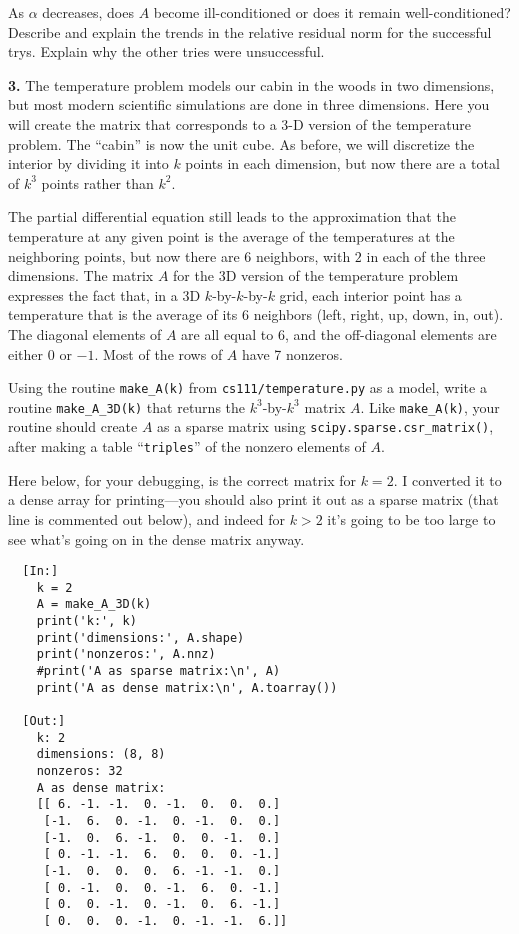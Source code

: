 \documentclass[11pt]{article}
\begin{document}
As $\alpha$ decreases, does $A$ become ill-conditioned or does it remain well-conditioned?
Describe and explain the trends in the relative residual norm 
for the successful trys.
Explain why the other tries were unsuccessful.

\par\bigskip
{\bf 3.}
The temperature problem models our cabin in the woods in two dimensions,
but most modern scientific simulations are done in three dimensions.
Here you will create the matrix that corresponds to a 3-D version of 
the temperature problem. The ``cabin'' is now the unit cube. As before,
we will discretize the interior by dividing it into $k$ points in each
dimension, but now there are a total of $k^3$ points rather than $k^2$.

The partial differential equation still leads to the approximation
that the temperature at any given point is the average of the temperatures
at the neighboring points, but now there are 6 neighbors, 
with $2$ in each of the three dimensions.
The matrix $A$ for the 3D version of the temperature problem
expresses the fact that, in a 3D $k$-by-$k$-by-$k$ grid, 
each interior point has a temperature that is the average of its 6 neighbors 
(left, right, up, down, in, out).
The diagonal elements of $A$ are all equal to $6$, 
and the off-diagonal elements are either $0$ or $-1$.
Most of the rows of $A$ have 7 nonzeros.

Using the routine {\tt make\_A(k)} from {\tt cs111/temperature.py} as a model, 
write a routine {\tt make\_A\_3D(k)} that returns the $k^3$-by-$k^3$ matrix $A$.
Like {\tt make\_A(k)}, your routine should create $A$ as a sparse matrix using
{\tt scipy.sparse.csr\_matrix()}, after making a table ``{\tt triples}'' of
the nonzero elements of $A$.

Here below, for your debugging, is the correct matrix for $k=2$.
I converted it to a dense array for printing---you should also
print it out as a sparse matrix (that line is commented out below), 
and indeed for $k>2$ it's going to be too
large to see what's going on in the dense matrix anyway.

\begin{verbatim}
  [In:]
    k = 2
    A = make_A_3D(k)
    print('k:', k)
    print('dimensions:', A.shape)
    print('nonzeros:', A.nnz)
    #print('A as sparse matrix:\n', A)
    print('A as dense matrix:\n', A.toarray())

  [Out:]
    k: 2
    dimensions: (8, 8)
    nonzeros: 32
    A as dense matrix:
    [[ 6. -1. -1.  0. -1.  0.  0.  0.]
     [-1.  6.  0. -1.  0. -1.  0.  0.]
     [-1.  0.  6. -1.  0.  0. -1.  0.]
     [ 0. -1. -1.  6.  0.  0.  0. -1.]
     [-1.  0.  0.  0.  6. -1. -1.  0.]
     [ 0. -1.  0.  0. -1.  6.  0. -1.]
     [ 0.  0. -1.  0. -1.  0.  6. -1.]
     [ 0.  0.  0. -1.  0. -1. -1.  6.]]
\end{verbatim}
\end{document}
